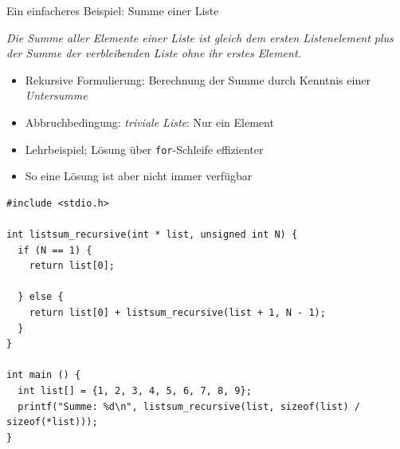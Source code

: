
\begin{frame}[fragile]{Ein einfacheres Beispiel: Summe einer Liste}
%
\begin{tcolorbox}
\emph{Die Summe aller Elemente einer Liste ist gleich dem ersten Listenelement plus der
Summe der verbleibenden Liste ohne ihr erstes Element.}
\end{tcolorbox}
%
\begin{itemize}
\item Rekursive Formulierung: Berechnung der Summe durch Kenntnis einer \emph{Untersumme}
\item Abbruchbedingung: \emph{triviale Liste}: Nur ein Element
\item Lehrbeispiel; Lösung über \texttt{for}-Schleife effizienter
\item So eine Lösung ist aber nicht immer verfügbar
\end{itemize}
%
\end{frame}


\begin{frame}[fragile]
%
\begin{codebox}
\begin{verbatim}
#include <stdio.h>

int listsum_recursive(int * list, unsigned int N) {
  if (N == 1) {
    return list[0];
    
  } else {
    return list[0] + listsum_recursive(list + 1, N - 1);
  }
}

int main () {
  int list[] = {1, 2, 3, 4, 5, 6, 7, 8, 9};
  printf("Summe: %d\n", listsum_recursive(list, sizeof(list) / sizeof(*list)));
}

\end{verbatim}
\end{codebox}
%
\end{frame}


